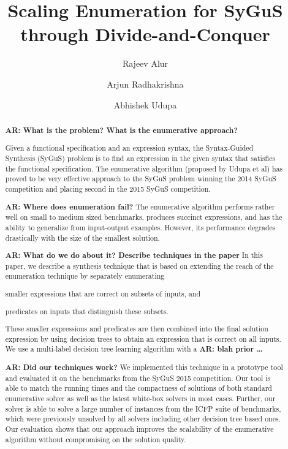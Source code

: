 \documentclass{llncs}
\newcommand\arsays[1]{{\bf AR: #1}}
\begin{document}
\title{Scaling Enumeration for SyGuS through Divide-and-Conquer}
\author{Rajeev Alur \and Arjun Radhakrishna \and Abhishek Udupa}
\maketitle

\begin{abstract}
  \arsays{What is the problem? What is the enumerative approach?}

  Given a functional specification and an expression syntax, the
  Syntax-Guided Synthesis (SyGuS) problem is to find an expression in
  the given syntax that satisfies the functional specification.
  The enumerative algorithm (proposed by Udupa et al) has proved to be
  very effective approach to the SyGuS problem winning the 2014 SyGuS
  competition and placing second in the 2015 SyGuS competition.

  \arsays{Where does enumeration fail?}
  The enumerative algorithm performs rather well on small to
  medium sized benchmarks, produces succinct expressions, and has the
  ability to generalize from input-output examples.
  However, its performance degrades drastically with the size of the
  smallest solution. 

  \arsays{What do we do about it? Describe techniques in the paper}
  In this paper, we describe a synthesis technique that is based on
  extending the reach of the enumeration technique by separately
  enumerating
  \begin{inparaenum}[(a)]
  \item smaller expressions that are correct on subsets of inputs, and
  \item predicates on inputs that distinguish these subsets.
  \end{inparaenum}
  These smaller expressions and predicates are then combined into the
  final solution expression by using decision trees to obtain an
  expression that is correct on all inputs.
  We use a multi-label decision tree learning algorithm with a \arsays{blah
  prior \dots }

  \arsays{Did our techniques work?}
  We implemented this technique in a prototype tool and evaluated it on
  the benchmarks from the SyGuS 2015 competition.
  Our tool is able to match the running times and the compactness of
  solutions of both standard enumerative solver as well as the latest
  white-box solvers in most cases.
  Further, our solver is able to solve a large number of instances from
  the ICFP suite of benchmarks, which were previously unsolved by all
  solvers including other decision tree based ones.
  Our evaluation shows that our approach improves the scalability of the
  enumerative algorithm without compromising on the solution quality.
\end{abstract}
\end{document}
